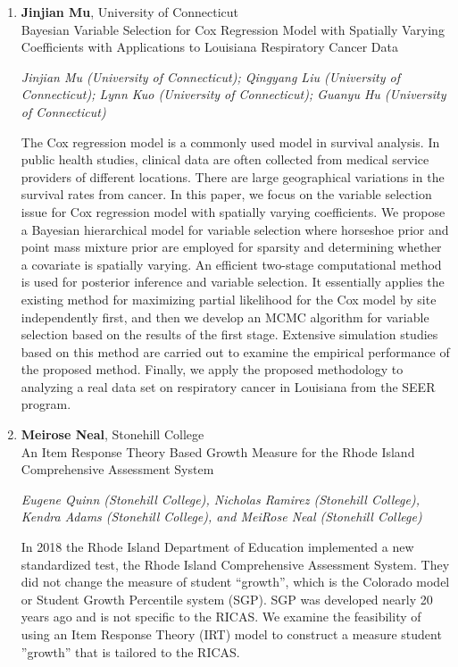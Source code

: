 \begin{enumerate}
\item \textbf{Jinjian Mu}, University of Connecticut \\
Bayesian Variable Selection for Cox Regression Model with Spatially Varying Coefficients with Applications to Louisiana Respiratory Cancer Data

\emph{\footnotesize Jinjian Mu (University of Connecticut); Qingyang Liu (University of Connecticut); Lynn Kuo (University of Connecticut); Guanyu Hu (University of Connecticut)}

The Cox regression model is a commonly used model in survival analysis. In public health studies, clinical data are often collected from medical service providers of different locations. There are large geographical variations in the survival rates from cancer. In this paper, we focus on the variable selection issue for Cox regression model with spatially varying coefficients. We propose a Bayesian hierarchical model for variable selection where horseshoe prior and point mass mixture prior are employed for sparsity and determining whether a covariate is spatially varying. An efficient two-stage computational method is used for posterior inference and variable selection. It essentially applies the existing method for maximizing partial likelihood for the Cox model by site independently first, and then we develop an MCMC algorithm for variable selection based on the results of the first stage. Extensive simulation studies based on this method are carried out to examine the empirical performance of the proposed method. Finally, we apply the proposed methodology to analyzing a real data set on respiratory cancer in Louisiana from the SEER program.

\item \textbf{Meirose Neal}, Stonehill College \\
An Item Response Theory Based Growth Measure for the Rhode Island Comprehensive Assessment System

\emph{\footnotesize Eugene Quinn (Stonehill College), Nicholas Ramirez (Stonehill College), Kendra Adams (Stonehill College), and MeiRose Neal (Stonehill College)}

In 2018 the Rhode Island Department of Education implemented a new standardized test, the Rhode Island Comprehensive Assessment System.  They did not change the measure of student ``growth'', which is the Colorado model or Student Growth Percentile system (SGP). SGP was developed nearly 20 years ago and is not specific to the RICAS. We examine the feasibility of using an Item Response Theory (IRT) model to construct a measure student ''growth'' that is tailored to the RICAS.


\end{enumerate}
